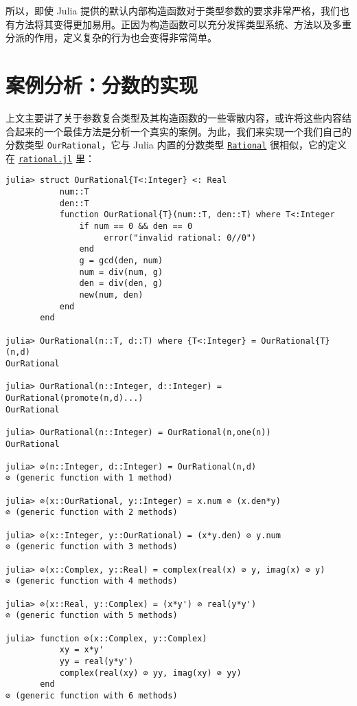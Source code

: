 所以，即使 Julia 提供的默认内部构造函数对于类型参数的要求非常严格，我们也有方法将其变得更加易用。正因为构造函数可以充分发挥类型系统、方法以及多重分派的作用，定义复杂的行为也会变得非常简单。



\hypertarget{4347124195691244322}{}


\section{案例分析：分数的实现}



上文主要讲了关于参数复合类型及其构造函数的一些零散内容，或许将这些内容结合起来的一个最佳方法是分析一个真实的案例。为此，我们来实现一个我们自己的分数类型 \texttt{OurRational}，它与 Julia 内置的分数类型 \hyperlink{8304566144531167610}{\texttt{Rational}} 很相似，它的定义在 \href{https://github.com/JuliaLang/julia/blob/master/base/rational.jl}{\texttt{rational.jl}} 里：




\begin{verbatim}
julia> struct OurRational{T<:Integer} <: Real
           num::T
           den::T
           function OurRational{T}(num::T, den::T) where T<:Integer
               if num == 0 && den == 0
                    error("invalid rational: 0//0")
               end
               g = gcd(den, num)
               num = div(num, g)
               den = div(den, g)
               new(num, den)
           end
       end

julia> OurRational(n::T, d::T) where {T<:Integer} = OurRational{T}(n,d)
OurRational

julia> OurRational(n::Integer, d::Integer) = OurRational(promote(n,d)...)
OurRational

julia> OurRational(n::Integer) = OurRational(n,one(n))
OurRational

julia> ⊘(n::Integer, d::Integer) = OurRational(n,d)
⊘ (generic function with 1 method)

julia> ⊘(x::OurRational, y::Integer) = x.num ⊘ (x.den*y)
⊘ (generic function with 2 methods)

julia> ⊘(x::Integer, y::OurRational) = (x*y.den) ⊘ y.num
⊘ (generic function with 3 methods)

julia> ⊘(x::Complex, y::Real) = complex(real(x) ⊘ y, imag(x) ⊘ y)
⊘ (generic function with 4 methods)

julia> ⊘(x::Real, y::Complex) = (x*y') ⊘ real(y*y')
⊘ (generic function with 5 methods)

julia> function ⊘(x::Complex, y::Complex)
           xy = x*y'
           yy = real(y*y')
           complex(real(xy) ⊘ yy, imag(xy) ⊘ yy)
       end
⊘ (generic function with 6 methods)
\end{verbatim}



